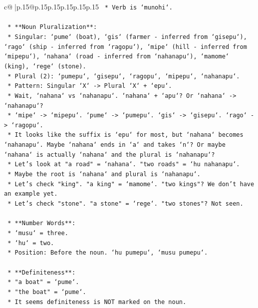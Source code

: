 \documentclass{article}
\begin{document}
{\begin{supertabular}{c@{$\;$}|p{.15\linewidth}@{}p{.15\linewidth}p{.15\linewidth}p{.15\linewidth}p{.15\linewidth}p{.15\linewidth}}
{{{\texttt{            *   Verb is `munohi`.} \\
\\ 
\texttt{    *   **Noun Pluralization**:} \\
\texttt{        *   Singular: `pume` (boat), `gis` (farmer {-} inferred from `gisepu`), `rago` (ship {-} inferred from `ragopu`), `mipe` (hill {-} inferred from `mipepu`), `nahana` (road {-} inferred from `nahanapu`), `mamome` (king), `rege` (stone).} \\
\texttt{        *   Plural (2): `pumepu`, `gisepu`, `ragopu`, `mipepu`, `nahanapu`.} \\
\texttt{        *   Pattern: Singular `X` {-}> Plural `X` + `epu`.} \\
\texttt{        *   Wait, `nahana` vs `nahanapu`. `nahana` + `apu`? Or `nahana` {-}> `nahanapu`?} \\
\texttt{        *   `mipe` {-}> `mipepu`. `pume` {-}> `pumepu`. `gis` {-}> `gisepu`. `rago` {-}> `ragopu`.} \\
\texttt{        *   It looks like the suffix is `epu` for most, but `nahana` becomes `nahanapu`. Maybe `nahana` ends in `a` and takes `n`? Or maybe `nahana` is actually `nahana` and the plural is `nahanapu`?} \\
\texttt{        *   Let's look at "a road" = `nahana`. "two roads" = `hu nahanapu`.} \\
\texttt{        *   Maybe the root is `nahana` and plural is `nahanapu`.} \\
\texttt{        *   Let's check "king". "a king" = `mamome`. "two kings"? We don't have an example yet.} \\
\texttt{        *   Let's check "stone". "a stone" = `rege`. "two stones"? Not seen.} \\
\\ 
\texttt{    *   **Number Words**:} \\
\texttt{        *   `musu` = three.} \\
\texttt{        *   `hu` = two.} \\
\texttt{        *   Position: Before the noun. `hu pumepu`, `musu pumepu`.} \\
\\ 
\texttt{    *   **Definiteness**:} \\
\texttt{        *   "a boat" = `pume`.} \\
\texttt{        *   "the boat" = `pume`.} \\
\texttt{        *   It seems definiteness is NOT marked on the noun.} \\
}}}
\end{supertabular}}
\end{document}
